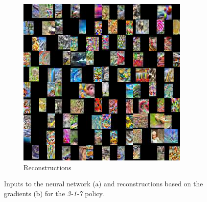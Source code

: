 \begin{figure}[hbt!]
\begin{subfigure}{.49\linewidth}
\includegraphics[width=\textwidth]{grids/data_cifar100_arch_ResNet20-4_epoch_200_optim_inversed_mode_aug_auglist_3-1-7_rlabel_False_reaugment_translate_clipped1_RECONSTRUCTIONS.png}
\caption{Reconstructions}%
\end{subfigure}%
\caption{Inputs to the neural network (a) and reconstructions based on the gradients (b) for the \textit{3-1-7} policy.}
    \label{fig:apprr}
\end{figure}


